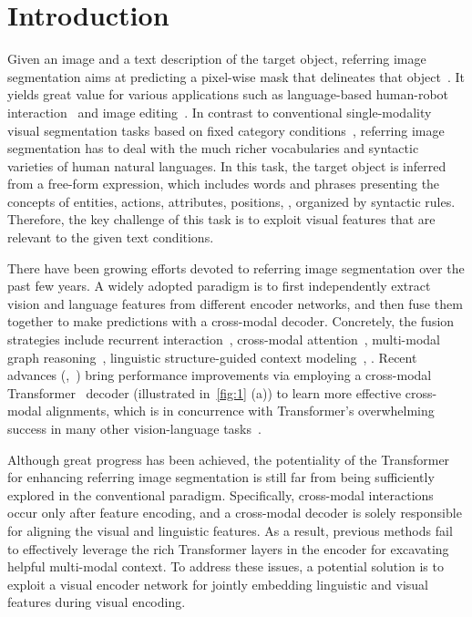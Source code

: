 \documentclass[10pt,twocolumn,letterpaper]{article}
\begin{document}
\section{Introduction}
\label{sec:intro}
Given an image and a text description of the target object, referring image segmentation aims at predicting a pixel-wise mask that delineates that object~\cite{cheng2014imagespirit, hu2016segmentation}.
It yields great value for various applications such as language-based human-robot interaction~\cite{wang2019reinforced} and image editing~\cite{chen2018language}.
In contrast to conventional single-modality visual segmentation tasks based on fixed category conditions~\cite{lin2014mscoco,ade}, referring image segmentation has to deal with the much richer vocabularies and syntactic varieties of human natural languages.
In this task, the target object is inferred from a free-form expression, which includes words and phrases presenting the concepts of entities, actions, attributes, positions, \etc, organized by syntactic rules.
Therefore, the key challenge of this task is to exploit visual features that are relevant to the given text conditions.

There have been growing efforts devoted to referring image segmentation over the past few years.
A widely adopted paradigm is to first independently extract vision and language features from different encoder networks, and then fuse them together to make predictions with a cross-modal decoder.
Concretely, the fusion strategies include recurrent interaction~\cite{liu2017recurrentInter,Li2018rrn}, cross-modal attention~\cite{shi2018key,chen2019see,hu2020brinet}, multi-modal graph reasoning~\cite{huang2020CMPC}, linguistic structure-guided context modeling~\cite{hui2020linguistic}, \etc.
Recent advances (\eg,~\cite{Ding_2021_vlt}) bring performance improvements via employing a cross-modal Transformer~\cite{attention-all-you-need} decoder (illustrated in~\cref{fig:1} (a)) to learn more effective cross-modal alignments, which is in concurrence with Transformer’s overwhelming success in many other vision-language tasks~\cite{clip, hu2021unit, ViLBERT, clipbert}.

Although great progress has been achieved, the potentiality of the Transformer for enhancing referring image segmentation is still far from being sufficiently explored in the conventional paradigm.
Specifically, cross-modal interactions occur only after feature encoding, and a cross-modal decoder is solely responsible for aligning the visual and linguistic features.
As a result, previous methods fail to effectively leverage the rich Transformer layers in the encoder for excavating helpful multi-modal context.
To address these issues, a potential solution is to exploit a visual encoder network for jointly embedding linguistic and visual features during visual encoding.
\end{document}
